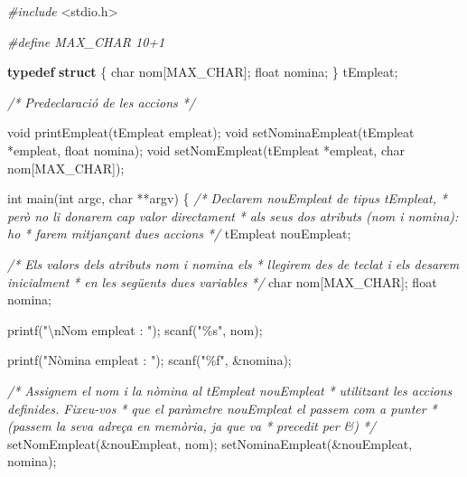 \documentclass[
]{book}
\newenvironment{Shaded}{\begin{snugshade}}{\end{snugshade}}
\newcommand{\CommentTok}[1]{\textcolor[rgb]{0.56,0.35,0.01}{\textit{#1}}}
\newcommand{\DataTypeTok}[1]{\textcolor[rgb]{0.13,0.29,0.53}{#1}}
\newcommand{\ImportTok}[1]{#1}
\newcommand{\KeywordTok}[1]{\textcolor[rgb]{0.13,0.29,0.53}{\textbf{#1}}}
\newcommand{\NormalTok}[1]{#1}
\newcommand{\PreprocessorTok}[1]{\textcolor[rgb]{0.56,0.35,0.01}{\textit{#1}}}
\newcommand{\SpecialCharTok}[1]{\textcolor[rgb]{0.00,0.00,0.00}{#1}}
\newcommand{\StringTok}[1]{\textcolor[rgb]{0.31,0.60,0.02}{#1}}
\begin{document}
\begin{Shaded}
\begin{Highlighting}[]
\PreprocessorTok{\#include }\ImportTok{\textless{}stdio.h\textgreater{}}

\PreprocessorTok{\#define MAX\_CHAR 10+1}

\KeywordTok{typedef} \KeywordTok{struct}\NormalTok{ \{}
    \DataTypeTok{char}\NormalTok{ nom[MAX\_CHAR];}
    \DataTypeTok{float}\NormalTok{ nomina;}
\NormalTok{\} tEmpleat;}

\CommentTok{/* Predeclaració de les accions */}

\DataTypeTok{void}\NormalTok{ printEmpleat(tEmpleat empleat);}
\DataTypeTok{void}\NormalTok{ setNominaEmpleat(tEmpleat *empleat, }\DataTypeTok{float}\NormalTok{ nomina);}
\DataTypeTok{void}\NormalTok{ setNomEmpleat(tEmpleat *empleat, }\DataTypeTok{char}\NormalTok{ nom[MAX\_CHAR]);}

\DataTypeTok{int}\NormalTok{ main(}\DataTypeTok{int}\NormalTok{ argc, }\DataTypeTok{char}\NormalTok{ **argv) \{}
    \CommentTok{/* Declarem nouEmpleat de tipus tEmpleat,}
\CommentTok{     * però no li donarem cap valor directament}
\CommentTok{     * als seus dos atributs (nom i nomina): ho }
\CommentTok{     * farem mitjançant dues accions }
\CommentTok{     */}
\NormalTok{    tEmpleat nouEmpleat;}
   
    \CommentTok{/* Els valors dels atributs nom i nomina els}
\CommentTok{     * llegirem des de teclat i els desarem inicialment}
\CommentTok{     * en les següents dues variables }
\CommentTok{     */}
    \DataTypeTok{char}\NormalTok{ nom[MAX\_CHAR];}
    \DataTypeTok{float}\NormalTok{ nomina;}
   
\NormalTok{    printf(}\StringTok{"}\SpecialCharTok{\textbackslash{}n}\StringTok{Nom empleat : "}\NormalTok{);}
\NormalTok{    scanf(}\StringTok{"\%s"}\NormalTok{, nom);}
      
\NormalTok{    printf(}\StringTok{"Nòmina empleat : "}\NormalTok{);}
\NormalTok{    scanf(}\StringTok{"\%f"}\NormalTok{, \&nomina);}
   
    \CommentTok{/* Assignem el nom i la nòmina al tEmpleat nouEmpleat}
\CommentTok{     * utilitzant les accions definides. Fixeu{-}vos}
\CommentTok{     * que el paràmetre nouEmpleat el passem com a punter}
\CommentTok{     * (passem la seva adreça en memòria, ja que va }
\CommentTok{     * precedit per \&) }
\CommentTok{     */}
\NormalTok{    setNomEmpleat(\&nouEmpleat, nom);}
\NormalTok{    setNominaEmpleat(\&nouEmpleat, nomina);}
   

\end{Highlighting}
\end{Shaded}
\end{document}
